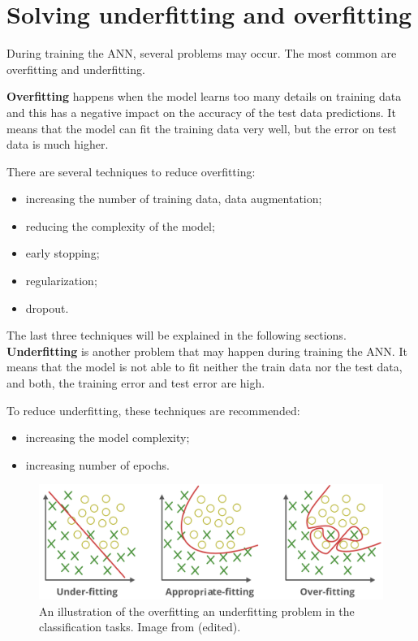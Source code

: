 \documentclass[thesis=B,english]{FITthesis}[2019/12/23]
\begin{document}
\section{Solving underfitting and overfitting}
During training the ANN, several problems may occur. The most common are overfitting and underfitting.

\textbf{Overfitting} happens when the model learns too many details on training data and this has a negative impact on the accuracy of the test data predictions. It means that the model can fit the training data very well, but the error on test data is much higher.

There are several techniques to reduce overfitting:
\begin{itemize}
	\item increasing the number of training data, data augmentation;
	\item reducing the complexity of the model;
	\item early stopping;
	\item regularization;
	\item dropout.
\end{itemize}

The last three techniques will be explained in the following sections. \\

\textbf{Underfitting} is another problem that may happen during training the ANN. It means that the model is not able to fit neither the train data nor the test data, and both, the training error and test error are high.

To reduce underfitting, these techniques are recommended:
\begin{itemize}
	\item increasing the model complexity;
	\item increasing number of epochs.
\end{itemize}

\begin{figure}[ht]
		\includegraphics[scale=0.3]{images/overffiting_underfitting.png}
		\centering
		\caption{An illustration of the overfitting an underfitting problem in the classification tasks. Image from \cite{underfitting_overfitting} (edited).}
\end{figure}
\end{document}
